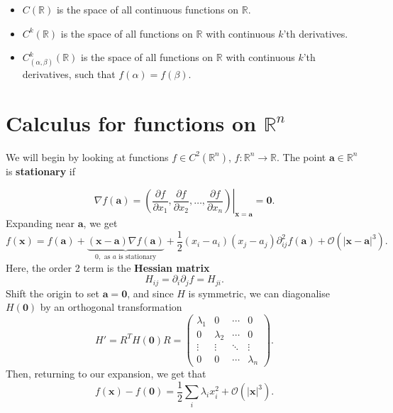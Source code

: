 \documentclass[12pt]{article}
\theoremstyle{definition}
\theoremstyle{remark}
\begin{document}
\begin{itemize}
	\item $C(\mathbb{R})$ is the space of all continuous functions on $\mathbb{R}$.
	\item $C^{k}(\mathbb{R})$ is the space of all functions on $\mathbb{R}$ with continuous $k$'th derivatives.
	\item $C_{(\alpha, \beta)}^{k}(\mathbb{R})$ is the space of all functions on $\mathbb{R}$ with continuous $k$'th derivatives, such that $f(\alpha) = f(\beta)$.
\end{itemize}

\newpage

\section{Calculus for functions on \texorpdfstring{$\mathbb{R}^{n}$}{Rn}}%
\label{sec:calculus_for_functions_on_r_n_}

We will begin by looking at functions $f \in C^2(\mathbb{R}^{n})$, $f : \mathbb{R}^{n} \to \mathbb{R}$. The point $\mathbf{a} \in \mathbb{R}^{n}$ is \textbf{stationary} if

\[
	\nabla f (\mathbf{a}) = \left. \left( \frac{\partial f}{\partial x_1}, \frac{\partial f}{\partial x_2}, \ldots, \frac{\partial f}{\partial x_n} \right) \right|_{\mathbf{x} = \mathbf{a}} = \mathbf{0}
.\]
Expanding near $\mathbf{a}$, we get
\[
	f(\mathbf{x}) = f(\mathbf{a}) + \underbrace{(\mathbf{x} - \mathbf{a}) \nabla f(\mathbf{a})}_{0, \text{ as $a$ is stationary}} + \frac{1}{2} (x_i - a_i)(x_j - a_j) \partial^2_{ij} f(\mathbf{a}) + \mathcal{O}(|\mathbf{x} - \mathbf{a}|^3)
.\]
Here, the order 2 term is the \textbf{Hessian matrix}
\[
H_{ij} = \partial_i \partial_{j} f = H_{ji}
.\]
Shift the origin to set $\mathbf{a} = \mathbf{0}$, and since $H$ is symmetric, we can diagonalise $H(\mathbf{0})$ by an orthogonal transformation
\[
	H' = R^{T} H(\mathbf{0}) R = 
	\begin{pmatrix}
		\lambda_1 & 0 & \cdots & 0 \\
			  0 & \lambda_2 & \cdots & 0 \\
			  \vdots & \vdots & \ddots & \vdots \\
			 0 & 0 & \cdots & \lambda_n
	\end{pmatrix}
.\]
Then, returning to our expansion, we get that
\[
	f(\mathbf{x}) - f(\mathbf{0}) = \frac{1}{2} \sum_{i} \lambda_i x_i^2 + \mathcal{O}(|\mathbf{x}|^3)
.\]
\end{document}
